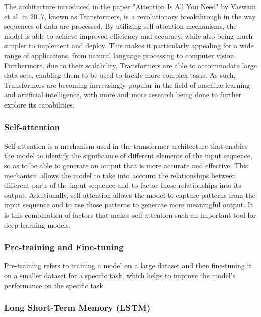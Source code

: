 The architecture introduced in the paper "Attention Is All You Need" by Vaswani et al. in 2017\cite{https://doi.org/10.48550/arxiv.1706.03762}, known as Transformers, is a revolutionary breakthrough in the way sequences of data are processed. By utilizing self-attention mechanisms, the model is able to achieve improved efficiency and accuracy, while also being much simpler to implement and deploy. This makes it particularly appealing for a wide range of applications, from natural language processing to computer vision. Furthermore, due to their scalability, Transformers are able to accommodate large data sets, enabling them to be used to tackle more complex tasks. As such, Transformers are becoming increasingly popular in the field of machine learning and artificial intelligence, with more and more research being done to further explore its capabilities.

\subsubsection{Self-attention}

Self-attention\cite{https://doi.org/10.48550/arxiv.1706.03762} is a mechanism used in the transformer architecture that enables the model to identify the significance of different elements of the input sequence, so as to be able to generate an output that is more accurate and effective. This mechanism allows the model to take into account the relationships between different parts of the input sequence and to factor those relationships into its output. Additionally, self-attention allows the model to capture patterns from the input sequence and to use those patterns to generate more meaningful output. It is this combination of factors that makes self-attention such an important tool for deep learning models.

\subsubsection{Pre-training and Fine-tuning}

Pre-training refers to training a model on a large dataset and then fine-tuning it on a smaller dataset for a specific task, which helps to improve the model's performance on the specific task.

\subsubsection{Long Short-Term Memory (LSTM)}

